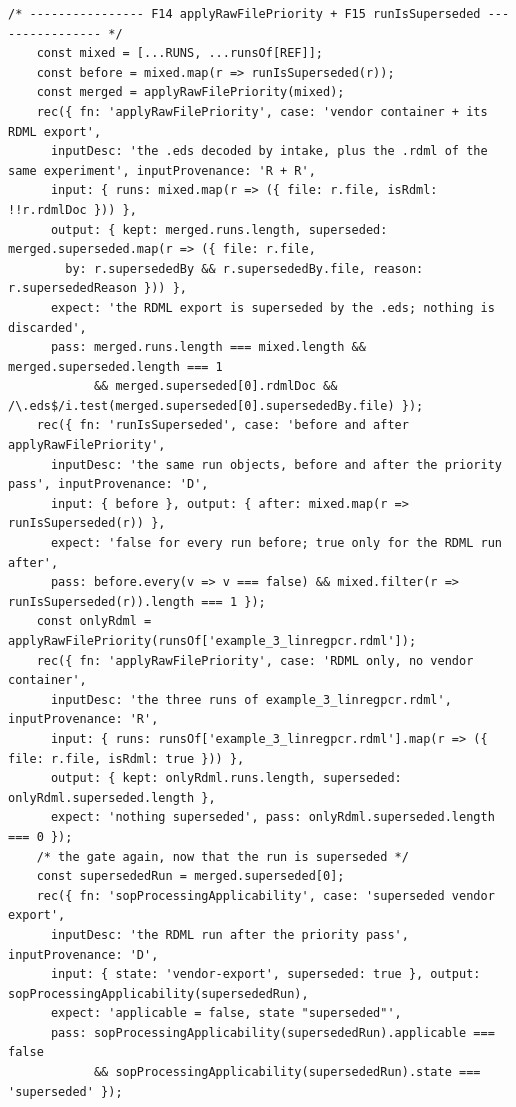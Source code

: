 \begin{lstlisting}[style=js]
    /* ---------------- F14 applyRawFilePriority + F15 runIsSuperseded ---------------- */
    const mixed = [...RUNS, ...runsOf[REF]];
    const before = mixed.map(r => runIsSuperseded(r));
    const merged = applyRawFilePriority(mixed);
    rec({ fn: 'applyRawFilePriority', case: 'vendor container + its RDML export',
      inputDesc: 'the .eds decoded by intake, plus the .rdml of the same experiment', inputProvenance: 'R + R',
      input: { runs: mixed.map(r => ({ file: r.file, isRdml: !!r.rdmlDoc })) },
      output: { kept: merged.runs.length, superseded: merged.superseded.map(r => ({ file: r.file,
        by: r.supersededBy && r.supersededBy.file, reason: r.supersededReason })) },
      expect: 'the RDML export is superseded by the .eds; nothing is discarded',
      pass: merged.runs.length === mixed.length && merged.superseded.length === 1
            && merged.superseded[0].rdmlDoc && /\.eds$/i.test(merged.superseded[0].supersededBy.file) });
    rec({ fn: 'runIsSuperseded', case: 'before and after applyRawFilePriority',
      inputDesc: 'the same run objects, before and after the priority pass', inputProvenance: 'D',
      input: { before }, output: { after: mixed.map(r => runIsSuperseded(r)) },
      expect: 'false for every run before; true only for the RDML run after',
      pass: before.every(v => v === false) && mixed.filter(r => runIsSuperseded(r)).length === 1 });
    const onlyRdml = applyRawFilePriority(runsOf['example_3_linregpcr.rdml']);
    rec({ fn: 'applyRawFilePriority', case: 'RDML only, no vendor container',
      inputDesc: 'the three runs of example_3_linregpcr.rdml', inputProvenance: 'R',
      input: { runs: runsOf['example_3_linregpcr.rdml'].map(r => ({ file: r.file, isRdml: true })) },
      output: { kept: onlyRdml.runs.length, superseded: onlyRdml.superseded.length },
      expect: 'nothing superseded', pass: onlyRdml.superseded.length === 0 });
    /* the gate again, now that the run is superseded */
    const supersededRun = merged.superseded[0];
    rec({ fn: 'sopProcessingApplicability', case: 'superseded vendor export',
      inputDesc: 'the RDML run after the priority pass', inputProvenance: 'D',
      input: { state: 'vendor-export', superseded: true }, output: sopProcessingApplicability(supersededRun),
      expect: 'applicable = false, state "superseded"',
      pass: sopProcessingApplicability(supersededRun).applicable === false
            && sopProcessingApplicability(supersededRun).state === 'superseded' });


\end{lstlisting}
